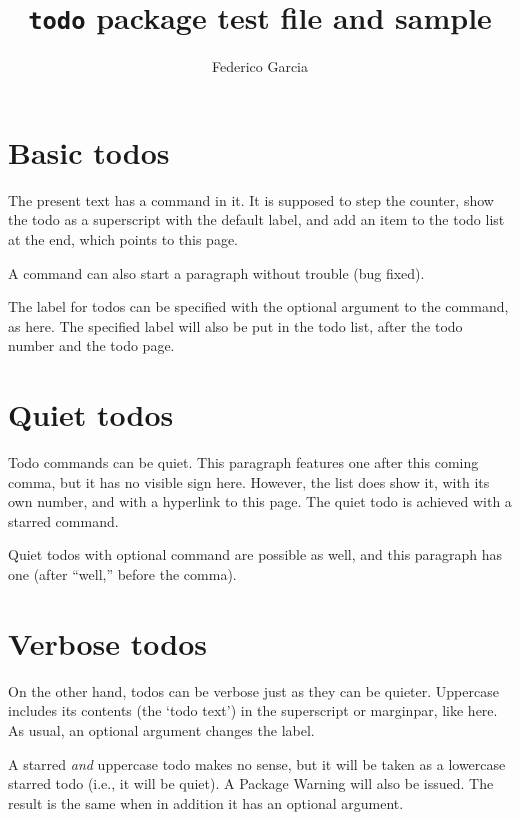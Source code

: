 \documentclass[12pt]{article}
\title{\texttt{todo} package test file and sample}
\author{Federico Garcia}
\providecommand\cs[1]{\texttt{\string#1}}
\begin{document}
\maketitle
\todos

\tableofcontents

\section{Basic todos}
The present text has a \cs{\todo} command in it. It is supposed to step the counter, show the todo as a superscript with the default label, and add an item to the todo list at the end, which points to this page.

A \cs{\todo} command can also start a paragraph without trouble (bug fixed).

The label for todos can be specified with the optional argument to the \cs{\todo} command, as here. The specified label will also be put in the todo list, after the todo number and the todo page.

\section{Quiet todos}
Todo commands can be quiet. This paragraph features one after this coming comma, but it has no visible sign here. However, the list does show it, with its own number, and with a hyperlink to this page. The quiet todo is achieved with a starred \texttt{\string\todo*} command.

Quiet todos with optional command are possible as well, and this paragraph has one (after ``well,'' before the comma).

\section{Verbose todos}
On the other hand, todos can be verbose just as they can be quieter. Uppercase \cs{\Todo} includes its contents (the `todo text') in the superscript or marginpar, like here. As usual, an optional argument changes the label.

A starred \emph{and} uppercase todo makes no sense, but it will be taken as a lowercase starred todo (i.e., it will be quiet). A Package Warning will also be issued. The result is the same when in addition it has an optional argument.
\end{document}
